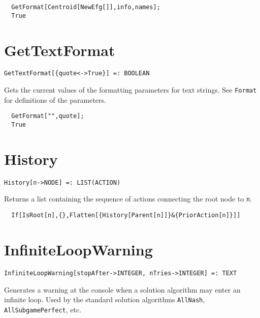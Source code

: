 \udfbody
\begin{verbatim}
  GetFormat[Centroid[NewEfg[]],info,names];
  True
\end{verbatim} 


\section*{GetTextFormat}\label{ExtGetTextFormat}
\begin{verbatim}
GetTextFormat[{quote<->True}] =: BOOLEAN 
\end{verbatim}

\noindent
Gets the current values of the formatting parameters for text strings.  See
\verb+Format+ for definitions of the parameters. 

\udfbody
\begin{verbatim}
  GetFormat["",quote];
  True
\end{verbatim} 


\section*{History}\label{ExtHistory}
\begin{verbatim}
History[n->NODE] =: LIST(ACTION) 
\end{verbatim}

\noindent
Returns a list containing the sequence of actions connecting the root
node to \verb+n+.

\udfbody
\begin{verbatim}
  If[IsRoot[n],{},Flatten[{History[Parent[n]]}&{PriorAction[n]}]]
\end{verbatim} 


\section*{InfiniteLoopWarning}\label{ExtInfiniteLoopWarning}
\begin{verbatim}
InfiniteLoopWarning[stopAfter->INTEGER, nTries->INTEGER] =: TEXT 
\end{verbatim}

\noindent
Generates a warning at the console when a solution algorithm may enter
an infinite loop.  Used by the standard solution algorithms
\verb+AllNash+, \verb+AllSubgamePerfect+, etc.  

